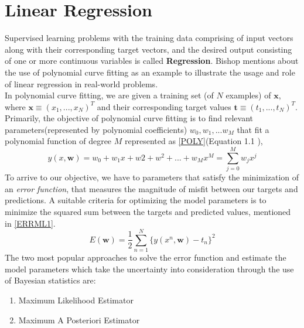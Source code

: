 \documentclass[12pt,twoside,a4paper]{article}
\title{\mytitle}
\author{\myauthors}
\date{\mydate}
\begin{document}
\maketitle

\begin{abstract}
ABSTRACT
\end{abstract}
\vspace{1ex}

\tableofcontents
\vfill
\pagebreak


\section{Linear Regression}
Supervised learning problems with the training data comprising of input vectors along with their corresponding target vectors, and the desired output consisting of one or more continuous variables is called \textbf{Regression}\cite{ChrisPRML}. Bishop\cite{ChrisPRML} mentions about the use of polynomial curve fitting as an example to illustrate the usage and role of linear regression in real-world problems.\\
In polynomial curve fitting, we are given a training set (of $N$ examples) of $\textbf{x}$, where $\textbf{x} \equiv (x_1,...,x_N)^T$ and their corresponding target values $\textbf{t} \equiv (t_1,...,t_N)^T$.\\
Primarily, the objective of polynomial curve fitting is to find relevant parameters(represented by polynomial coefficients) $w_0, w_1, ... w_M$ that fit a polynomial function of degree $M$ represented as \ref{POLY}(Equation 1.1 \cite{ChrisPRML}),
\begin{equation}\label{POLY}
    y(x, \textbf{w}) = w_0 + w_1x + w2+w^2 + ... + w_Mx^M = \sum_{j=0}^{M}w_jx^j
\end{equation}
To arrive to our objective, we have to parameters that satisfy the minimization of an \textit{error function}, that measures the magnitude of misfit between our targets and predictions. A suitable criteria for optimizing the model parameters is to minimize the squared sum between the targets and predicted values, mentioned in \ref{ERRML1}.
\begin{equation}\label{ERRML1}
    E(\textbf{w}) = \frac{1}{2}\sum_{n=1}^{N}\{y(x^n, \textbf{w})-t_n\}^2
\end{equation}
The two most popular approaches to solve the error function and estimate the model parameters which take the uncertainty into consideration through the use of Bayesian statistics are:
\begin{enumerate}
    \item Maximum Likelihood Estimator
    \item Maximum A Posteriori Estimator
\end{enumerate}
\end{document}
